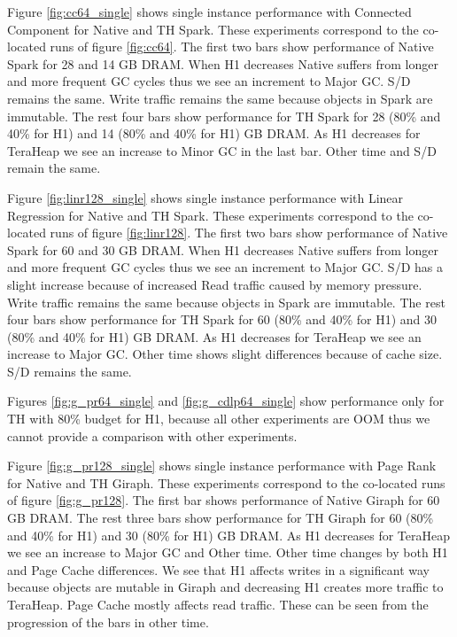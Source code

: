 Figure \ref{fig:cc64_single} shows single instance performance with Connected Component for Native and TH Spark. These experiments correspond to the co-located runs of figure \ref{fig:cc64}. The first two bars show performance of Native Spark for 28 and 14 GB DRAM. When H1 decreases Native suffers from longer and more frequent GC cycles thus we see an increment to Major GC. S/D remains the same. Write traffic remains the same because objects in Spark are immutable. The rest four bars show performance for TH Spark for 28 (80\% and 40\% for H1) and 14 (80\% and 40\% for H1) GB DRAM. As H1 decreases for TeraHeap we see an increase to Minor GC in the last bar. Other time and S/D remain the same.

Figure \ref{fig:linr128_single} shows single instance performance with Linear Regression for Native and TH Spark. These experiments correspond to the co-located runs of figure \ref{fig:linr128}. The first two bars show performance of Native Spark for 60 and 30 GB DRAM. When H1 decreases Native suffers from longer and more frequent GC cycles thus we see an increment to Major GC. S/D has a slight increase because of increased Read traffic caused by memory pressure. Write traffic remains the same because objects in Spark are immutable. The rest four bars show performance for TH Spark for 60 (80\% and 40\% for H1) and 30 (80\% and 40\% for H1) GB DRAM. As H1 decreases for TeraHeap we see an increase to Major GC. Other time shows slight differences because of cache size. S/D remains the same.

Figures \ref{fig:g_pr64_single} and \ref{fig:g_cdlp64_single} show performance only for TH with 80\% budget for H1, because all other experiments are OOM thus  we cannot provide a comparison with other experiments.

Figure \ref{fig:g_pr128_single} shows single instance performance with Page Rank for Native and TH Giraph. These experiments correspond to the co-located runs of figure \ref{fig:g_pr128}. The first bar shows performance of Native Giraph for 60 GB DRAM. The rest three bars show performance for TH Giraph for 60 (80\% and 40\% for H1) and 30 (80\% for H1) GB DRAM. As H1 decreases for TeraHeap we see an increase to Major GC  and Other time. Other time changes by both H1 and Page Cache differences. We see that H1 affects writes in a significant way because objects are mutable in Giraph and decreasing H1 creates more traffic to TeraHeap. Page Cache mostly affects read traffic. These can be seen from the progression of the bars in other time.

